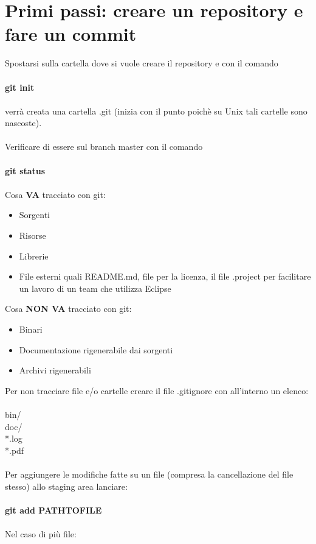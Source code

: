 \documentclass[a4paper,12pt]{report}
\begin{document}
\chapter{Primi passi: creare un repository e fare un commit}
Spostarsi sulla cartella dove si vuole creare il repository e con il comando
\\\\
\textbf{git init}
\\\\
verrà creata una cartella .git (inizia con il punto poichè su Unix tali cartelle sono nascoste).
\\\\
Verificare di essere sul branch master con il comando
\\\\
\textbf{git status}
\\\\
Cosa \textbf{VA} tracciato con git:
\begin{itemize}
\item Sorgenti
\item Risorse
\item Librerie
\item File esterni quali README.md, file per la licenza, il file .project per facilitare un lavoro di un team che utilizza Eclipse
\end{itemize}
Cosa \textbf{NON VA}  tracciato con git:
\begin{itemize}
\item Binari
\item Documentazione rigenerabile dai sorgenti
\item Archivi rigenerabili 
\end{itemize}
Per non tracciare file e/o cartelle creare il file .gitignore con all'interno un elenco:
\\\\
bin/
\\
doc/
\\
*.log
\\
*.pdf
\\\\
Per aggiungere le modifiche fatte su un file (compresa la cancellazione del file stesso) allo staging area lanciare:
\\\\
\textbf{git add PATH\textunderscore TO\textunderscore FILE}
\\\\
Nel caso di più file:
\\\\
\end{document}
